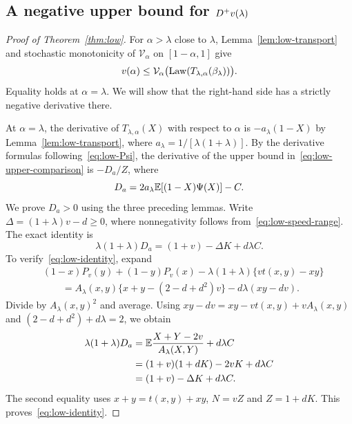 \subsection{A negative upper bound for \texorpdfstring{$D^{+} v(\lambda)$}{the upper right Dini derivative}}
\begin{proof}[Proof of Theorem~\ref{thm:low}]
For $\alpha>\lambda$ close to $\lambda$, Lemma~\ref{lem:low-transport} and stochastic monotonicity of $\mathcal V_\alpha$ on $[1-\alpha,1]$ give
\begin{equation}\label{eq:low-upper-comparison}
 v(\alpha)\le
 \mathcal V_\alpha\bigl(\operatorname{Law}(T_{\lambda,\alpha}(\beta_\lambda))\bigr).
\end{equation}
Equality holds at $\alpha=\lambda$. We will show that the right-hand side has a strictly negative derivative there.


At $\alpha=\lambda$, the derivative of $T_{\lambda,\alpha}(X)$ with respect to $\alpha$ is $-a_\lambda(1-X)$ by Lemma~\ref{lem:low-transport}, where $a_\lambda=1/[\lambda(1+\lambda)]$. By the derivative formulas following~\eqref{eq:low-Psi}, the derivative of the upper bound in~\eqref{eq:low-upper-comparison} is $-D_a/Z$, where
\begin{equation}\label{eq:low-margin}
 D_a=2a_\lambda\mathbb E[(1-X)\Psi(X)]-C.
\end{equation}
We prove $D_a>0$ using the three preceding lemmas. Write $\Delta=(1+\lambda)v-d\ge0$, where nonnegativity follows from~\eqref{eq:low-speed-range}. The exact identity is
\begin{equation}\label{eq:low-identity}
 \lambda(1+\lambda)D_a=(1+v)-\Delta K+d\lambda C.
\end{equation}
To verify~\eqref{eq:low-identity}, expand
\begin{align*}
 &(1-x)P_v(y)+(1-y)P_v(x)-\lambda(1+\lambda)\{vt(x,y)-xy\}\\
 &\qquad=A_\lambda(x,y)\{x+y-(2-d+d^2)v\}-d\lambda(xy-dv).
\end{align*}
Divide by $A_\lambda(x,y)^2$ and average. Using $xy-dv=xy-vt(x,y)+vA_\lambda(x,y)$ and $(2-d+d^2)+d\lambda=2$, we obtain
\begin{align*}
 \lambda(1+\lambda)D_a
 &=\mathbb E\frac{X+Y-2v}{A_\lambda(X,Y)}+d\lambda C\\
 &=(1+v)(1+dK)-2vK+d\lambda C\\
 &=(1+v)-\Delta K+d\lambda C.
\end{align*}
The second equality uses $x+y=t(x,y)+xy$, $N=vZ$ and $Z=1+dK$. This proves~\eqref{eq:low-identity}.


\end{proof}
